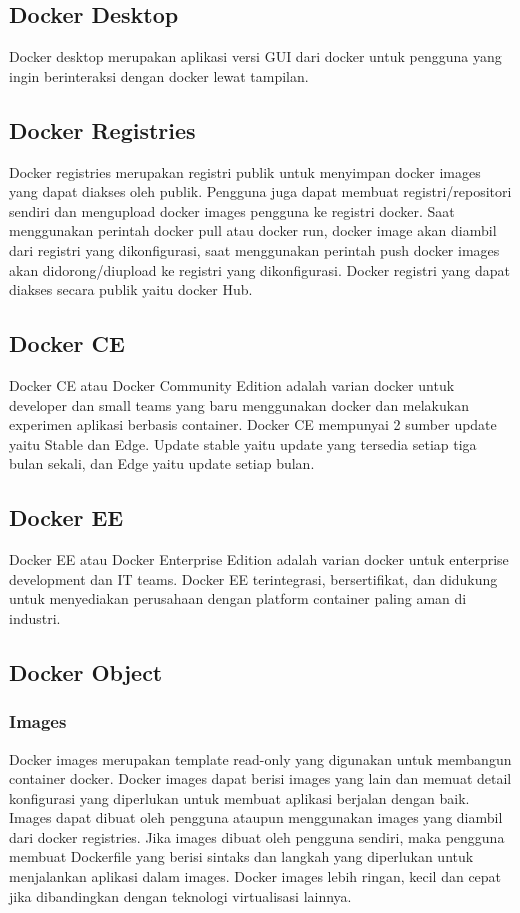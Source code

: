\subsection{Docker Desktop}
Docker desktop merupakan aplikasi versi GUI dari docker untuk pengguna yang ingin berinteraksi dengan docker lewat tampilan.

\subsection{Docker Registries}
Docker registries merupakan registri publik untuk menyimpan docker images yang dapat diakses oleh publik. Pengguna juga dapat membuat 
registri/repositori sendiri dan mengupload docker images pengguna ke registri docker. Saat menggunakan perintah docker pull atau docker run, 
docker image akan diambil dari registri yang dikonfigurasi, saat menggunakan perintah push docker images akan didorong/diupload ke registri 
yang dikonfigurasi. Docker registri yang dapat diakses secara publik yaitu docker Hub.

\subsection{Docker CE}
Docker CE atau Docker Community Edition adalah varian docker untuk developer dan small teams yang baru menggunakan docker dan melakukan 
experimen aplikasi berbasis container. Docker CE mempunyai 2 sumber update yaitu Stable dan Edge. Update stable yaitu update yang tersedia 
setiap tiga bulan sekali, dan Edge yaitu update setiap bulan.

\subsection{Docker EE}
Docker EE atau Docker Enterprise Edition adalah varian docker untuk enterprise development dan IT teams. Docker EE terintegrasi, 
bersertifikat, dan didukung untuk menyediakan perusahaan dengan platform container paling aman di industri.


\subsection{Docker Object}

\subsubsection{Images}

Docker images merupakan template read-only yang digunakan untuk membangun container docker. Docker images dapat berisi images yang 
lain dan memuat detail konfigurasi yang diperlukan untuk membuat aplikasi berjalan dengan baik. Images dapat dibuat oleh pengguna 
ataupun menggunakan images yang diambil dari docker registries. Jika images dibuat oleh pengguna sendiri, maka pengguna membuat 
Dockerfile yang berisi sintaks dan langkah yang diperlukan untuk menjalankan aplikasi dalam images. Docker images lebih ringan, 
kecil dan cepat jika dibandingkan dengan teknologi virtualisasi lainnya.

